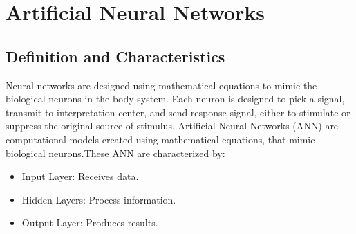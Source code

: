 \documentclass[12pt,a4paper]{article}
\begin{document}
%

%
\section{Artificial Neural Networks}
\subsection{Definition and Characteristics}
Neural networks are designed using mathematical equations to mimic the biological neurons in the body system. Each neuron is designed to pick a signal, transmit to interpretation center, and send response signal, either to stimulate or suppress the original source of stimulus.
Artificial Neural Networks (ANN) are computational models created using mathematical equations, that mimic biological neurons.These ANN are characterized by:
\begin{itemize}
\item Input Layer: Receives data.
\item Hidden Layers: Process information.
\item Output Layer: Produces results.
\end{itemize}
\end{document}
